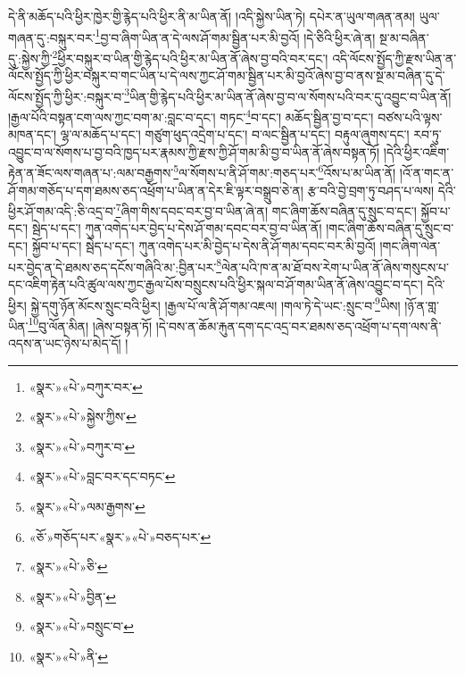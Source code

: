 དེ་ནི་མཆོད་པའི་ཕྱིར་ཁྱེར་གྱི་རྙེད་པའི་ཕྱིར་ནི་མ་ཡིན་ནོ། །འདི་སྐྱེས་ཡིན་ཏེ། དཔེར་ན་ཡུལ་གཞན་ནམ། ཡུལ་གཞན་དུ་:བསྐུར་བར་\footnote{«སྣར་»«པེ་»བཀུར་བར་}བྱ་བ་ཞིག་ཡིན་ན་དེ་ལས་ཤོ་གམ་སྦྱིན་པར་མི་བྱའོ། །དེ་ཅིའི་ཕྱིར་ཞེ་ན། སྔ་མ་བཞིན་དུ་:སྐྱེས་ཀྱི་\footnote{«སྣར་»«པེ་»སྐྱེས་ཀྱིས་}ཕྱིར་བསྐུར་བ་ཡིན་གྱི་རྙེད་པའི་ཕྱིར་མ་ཡིན་ནོ་ཞེས་བྱ་བའི་བར་དང་། འདི་ལོངས་སྤྱོད་ཀྱི་རྫས་ཡིན་ན་ལོངས་སྤྱོད་ཀྱི་ཕྱིར་བསྐུར་བ་གང་ཡིན་པ་དེ་ལས་ཀྱང་ཤོ་གམ་སྦྱིན་པར་མི་བྱའོ་ཞེས་བྱ་བ་ནས་སྔ་མ་བཞིན་དུ་དེ་ལོངས་སྤྱོད་ཀྱི་ཕྱིར་:བསྐུར་བ་\footnote{«སྣར་»«པེ་»བཀུར་བ་}ཡིན་གྱི་རྙེད་པའི་ཕྱིར་མ་ཡིན་ནོ་ཞེས་བྱ་བ་ལ་སོགས་པའི་བར་དུ་འབྱུང་བ་ཡིན་ནོ། །རྒྱལ་པོའི་བསྟན་ངག་ལས་ཀྱང་བག་མ་:བླང་བ་དང་། གཏང་\footnote{«སྣར་»«པེ་»བླང་བར་དང་བཏང་}བ་དང་། མཆོད་སྦྱིན་བྱ་བ་དང་། བཙས་པའི་ལྟས་མཁན་དང་། ལྷ་ལ་མཆོད་པ་དང་། གཙུག་ཕུད་འདྲེག་པ་དང་། བ་ལང་སྦྱིན་པ་དང་། བརྟུལ་ཞུགས་དང་། རབ་ཏུ་འབྱུང་བ་ལ་སོགས་པ་བྱ་བའི་ཁྱད་པར་རྣམས་ཀྱི་རྫས་ཀྱི་ཤོ་གམ་མི་བྱ་བ་ཡིན་ནོ་ཞེས་བསྟན་ཏོ། །དེའི་ཕྱིར་འཇིག་རྟེན་ན་ཟོང་ལས་གཞན་པ་:ལམ་བརྒྱགས་\footnote{«སྣར་»«པེ་»ལམ་རྒྱགས་}ལ་སོགས་པ་ནི་ཤོ་གམ་:གཅད་པར་\footnote{«ཅོ་»གཅོད་པར་«སྣར་»«པེ་»བཅད་པར་}འོས་པ་མ་ཡིན་ནོ། །འོ་ན་གང་ན་ཤོ་གམ་གཅོད་པ་དག་ཐམས་ཅད་འཕྲོག་པ་ཡིན་ན་དེར་ཇི་ལྟར་བསྒྲུབ་ཅེ་ན། རྩ་བའི་བྱེ་བྲག་ཏུ་བཤད་པ་ལས། དེའི་ཕྱིར་ཤོ་གམ་འདི་:ཅི་འདྲ་བ་\footnote{«སྣར་»«པེ་»ཅི་}ཞིག་གིས་དབང་བར་བྱ་བ་ཡིན་ཞེ་ན། གང་ཞིག་ཆོས་བཞིན་དུ་སྲུང་བ་དང་། སྐྱོབ་པ་དང་། སྦེད་པ་དང་། ཀུན་འགེད་པར་བྱེད་པ་དེས་ཤོ་གམ་དབང་བར་བྱ་བ་ཡིན་ནོ། །གང་ཞིག་ཆོས་བཞིན་དུ་སྲུང་བ་དང་། སྐྱོབ་པ་དང་། སྦེད་པ་དང་། ཀུན་འགེད་པར་མི་བྱེད་པ་དེས་ནི་ཤོ་གམ་དབང་བར་མི་བྱའོ། །གང་ཞིག་ལེན་པར་བྱེད་ན་དེ་ཐམས་ཅད་དངོས་གཞིའི་མ་:བྱིན་པར་\footnote{«སྣར་»«པེ་»བྱིན་}ལེན་པའི་ཁ་ན་མ་ཐོ་བས་རེག་པ་ཡིན་ནོ་ཞེས་གསུངས་པ་དང་འཇིག་རྟེན་པའི་ཚུལ་ལས་ཀྱང་རྒྱལ་པོས་བསྲུངས་པའི་ཕྱིར་སྐལ་བ་ཤོ་གམ་ཡིན་ནོ་ཞེས་འབྱུང་བ་དང་། དེའི་ཕྱིར། སྐྱེ་དགུ་ཉོན་མོངས་སྲུང་བའི་ཕྱིར། །རྒྱལ་པོ་ལ་ནི་ཤོ་གམ་འཇལ། །གལ་ཏེ་དེ་ཡང་:སྲུང་བ་\footnote{«སྣར་»«པེ་»བསྲུང་བ་}ཡིས། །ཉོ་ན་གླ་ཡིན་\footnote{«སྣར་»«པེ་»ནི་}བུ་ལོན་མིན། །ཞེས་བསྟན་ཏོ། །དེ་བས་ན་ཆོམ་རྐུན་དག་དང་འདྲ་བར་ཐམས་ཅད་འཕྲོག་པ་དག་ལས་ནི་འདས་ན་ཡང་ཉེས་པ་མེད་དོ། །
